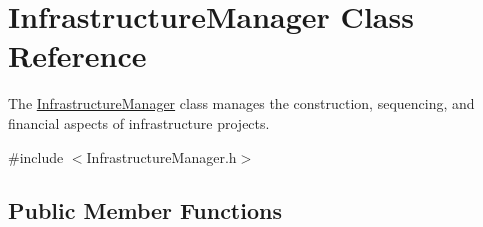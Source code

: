 \hypertarget{classInfrastructureManager}{}\section{Infrastructure\+Manager Class Reference}
\label{classInfrastructureManager}


The {\ttfamily \mbox{\hyperlink{classInfrastructureManager}{Infrastructure\+Manager}}} class manages the construction, sequencing, and financial aspects of infrastructure projects.  




{\ttfamily \#include $<$Infrastructure\+Manager.\+h$>$}

\subsection*{Public Member Functions}
